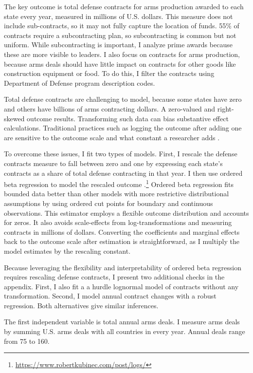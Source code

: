 \documentclass[12pt]{article}
\begin{document}
The key outcome is total defense contracts for arms production awarded to each state every year, measured in millions of U.S. dollars.
This measure does not include sub-contracts, so it may not fully capture the location of funds. 
55\% of contracts require a subcontracting plan, so subcontracting is common but not uniform.  
While subcontracting is important, I analyze prime awards because these are more visible to leaders. 
I also focus on contracts for arms production, because arms deals should have little impact on contracts for other goods like construction equipment or food.
To do this, I filter the contracts using Department of Defense program description codes. 


Total defense contracts are challenging to model, because some states have zero and others have billions of arms contracting dollars. 
A zero-valued and right-skewed outcome results. 
Transforming such data can bias substantive effect calculations.
Traditional practices such as logging the outcome after adding one are sensitive to the outcome scale and what constant a researcher adds \citep{ChenRoth2022, MullahyNorton2022}. 


To overcome these issues, I fit two types of models.
First, I rescale the defense contracts measure to fall between zero and one by expressing each state's contracts as a share of total defense contracting in that year.
I then use ordered beta regression to model the rescaled outcome \citep{Kubinec2023}.\footnote{\url{https://www.robertkubinec.com/post/logs/}} 
Ordered beta regression fits bounded data better than other models with more restrictive distributional assumptions by using ordered cut points for boundary and continuous observations. 
This estimator employs a flexible outcome distribution and accounts for zeros.
It also avoids scale-effects from log-transformations and measuring contracts in millions of dollars. 
Converting the coefficients and marginal effects back to the outcome scale after estimation is straightforward, as I multiply the model estimates by the rescaling constant.


Because leveraging the flexibility and interpretability of ordered beta regression requires rescaling defense contracts, I present two additional checks in the appendix. 
First, I also fit a a hurdle lognormal model of contracts without any transformation.
Second, I model annual contract changes with a robust regression. 
Both alternatives give similar inferences.


The first independent variable is total annual arms deals.  
I measure arms deals by summing U.S. arms deals with all countries in every year. 
Annual deals range from 75 to 160. 
\end{document}
